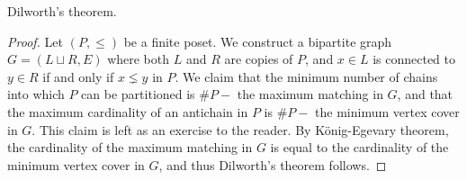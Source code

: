 \begin{corollary}
    Dilworth's theorem.
\end{corollary}
\begin{proof}
    Let $(P,\leq)$ be a finite poset. We construct a bipartite graph $G = (L \sqcup R,E)$ where both $L$ and $R$ are copies of $P$, and $x \in L$ is connected to $y \in R$ if and only if $x \lneq y$ in $P$. We claim that the minimum number of chains into which $P$ can be partitioned is $\# P -$ the maximum matching in $G$, and that the maximum cardinality of an antichain in $P$ is $\# P -$ the minimum vertex cover in $G$. This claim is left as an exercise to the reader. By K\"onig-Egevary theorem, the cardinality of the maximum matching in $G$ is equal to the cardinality of the minimum vertex cover in $G$, and thus Dilworth's theorem follows.
\end{proof}